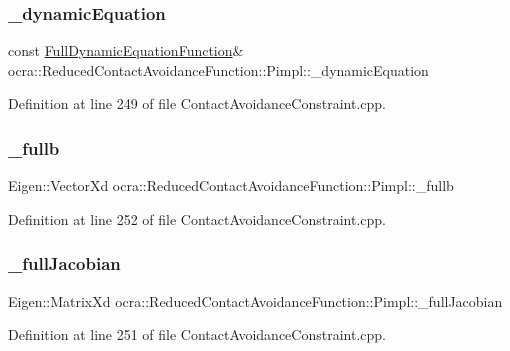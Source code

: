 \subsubsection{\texorpdfstring{\+\_\+dynamic\+Equation}{\_dynamicEquation}}
{\footnotesize\ttfamily const \hyperlink{classocra_1_1FullDynamicEquationFunction}{Full\+Dynamic\+Equation\+Function}\& ocra\+::\+Reduced\+Contact\+Avoidance\+Function\+::\+Pimpl\+::\+\_\+dynamic\+Equation}



Definition at line 249 of file Contact\+Avoidance\+Constraint.\+cpp.

\hypertarget{structReducedContactAvoidanceFunction_1_1Pimpl_ade6d248f540e91b5b9cfe961981d03a3}{}\label{structReducedContactAvoidanceFunction_1_1Pimpl_ade6d248f540e91b5b9cfe961981d03a3} 
\subsubsection{\texorpdfstring{\+\_\+fullb}{\_fullb}}
{\footnotesize\ttfamily Eigen\+::\+Vector\+Xd ocra\+::\+Reduced\+Contact\+Avoidance\+Function\+::\+Pimpl\+::\+\_\+fullb}



Definition at line 252 of file Contact\+Avoidance\+Constraint.\+cpp.

\hypertarget{structReducedContactAvoidanceFunction_1_1Pimpl_a6ddc277e90776add368eee6a56494f45}{}\label{structReducedContactAvoidanceFunction_1_1Pimpl_a6ddc277e90776add368eee6a56494f45} 
\subsubsection{\texorpdfstring{\+\_\+full\+Jacobian}{\_fullJacobian}}
{\footnotesize\ttfamily Eigen\+::\+Matrix\+Xd ocra\+::\+Reduced\+Contact\+Avoidance\+Function\+::\+Pimpl\+::\+\_\+full\+Jacobian}



Definition at line 251 of file Contact\+Avoidance\+Constraint.\+cpp.

